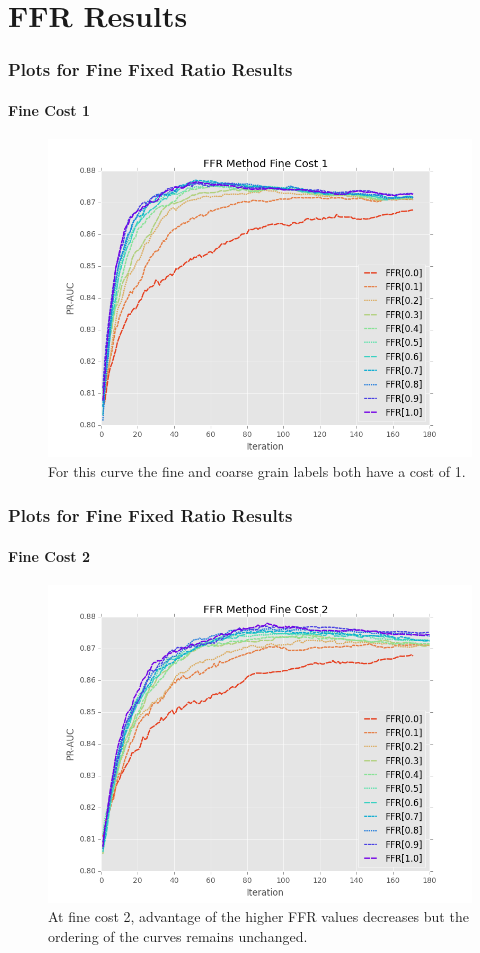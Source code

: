 \documentclass{beamer}
\begin{document}
\section{FFR Results}
\begin{frame}
    \frametitle{Plots for Fine Fixed Ratio Results}
    \framesubtitle{Fine Cost 1}
    \begin{figure}[!htb]
	\centering
    \includegraphics[width=0.7\columnwidth]{fig/ParamsFFR_PR_Cost1_rnds0_180}
    \caption{For this curve the fine and coarse grain labels
    both have a cost of 1.}
\end{figure}
\end{frame}
\begin{frame}
    \frametitle{Plots for Fine Fixed Ratio Results}
    \framesubtitle{Fine Cost 2}
    \begin{figure}[!htb]
        \centering
        \includegraphics[width=0.7\columnwidth]{fig/ParamsFFR_PR_Cost2_rnds0_180}
        \caption{At fine cost 2, advantage of the higher FFR values decreases but the ordering
        of the curves remains unchanged.}
        \label{fig:ParamsFFR_PR_Cost2_rnds0_180}
    \end{figure}
\end{frame}
\end{document}
